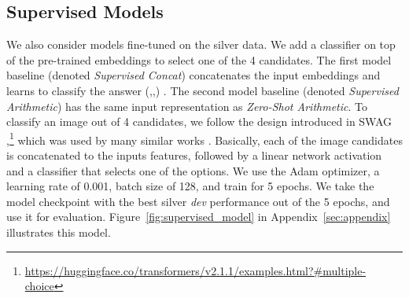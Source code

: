\documentclass[letterpaper]{article} \usepackage{aaai23}  \usepackage{times}  \usepackage{helvet}  \usepackage{courier}  \usepackage[hyphens]{url}  \usepackage{graphicx} \urlstyle{rm} \def\UrlFont{\rm}  \usepackage{natbib}  \usepackage{caption} \frenchspacing  \setlength{\pdfpagewidth}{8.5in}  \setlength{\pdfpageheight}{11in}  \usepackage{algorithm}
\newcommand{\zeroshot}[0]{\emph{Zero-Shot Arithmetic}}
\newcommand{\trainedarithmetic}[0]{\emph{Supervised Arithmetic}}
\newcommand{\trainedconcat}[0]{\emph{Supervised Concat}}
\begin{document}
\subsection{Supervised Models} 
We also consider models fine-tuned on the silver data. We add a classifier on top of the pre-trained embeddings to select one of the 4 candidates. The first model baseline (denoted \trainedconcat{}) concatenates the input embeddings and learns to classify the answer (,,)  . The second model baseline (denoted \trainedarithmetic{}) has the same input representation as \zeroshot{}. To classify an image out of 4 candidates, we follow the design introduced in SWAG \cite{zellers2018swag},\footnote{\url{https://huggingface.co/transformers/v2.1.1/examples.html?#multiple-choice}} which was used by many similar works \cite{sun2019dream,huang2019cosmos,liang2019new,dzendzik2021english}. Basically, each of the image candidates is concatenated to the inputs features, followed by a linear network activation and a classifier that selects one of the options. We use the Adam \cite{kingma2014adam} optimizer, a learning rate of 0.001, batch size of 128, and train for 5 epochs. We take the model checkpoint with the best silver \emph{dev} performance out of the 5 epochs, and use it for evaluation. Figure~\ref{fig:supervised_model} in Appendix~\ref{sec:appendix} illustrates this model.
\end{document}
